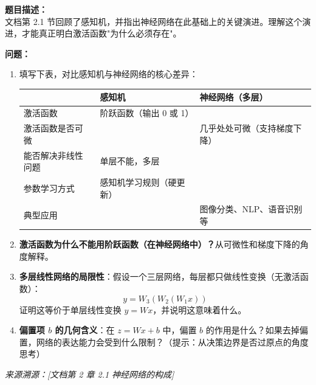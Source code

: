 \documentclass[a4paper,11pt]{ctexart}
\begin{document}
\begin{problembox}
    \textbf{题目描述：}\\
    文档第 2.1 节回顾了感知机，并指出神经网络在此基础上的关键演进。理解这个演进，才能真正明白激活函数"为什么必须存在"。

    \vspace{0.3cm}
    \textbf{问题：}
    \begin{enumerate}[(1)]
        \item 填写下表，对比感知机与神经网络的核心差异：

        \begin{center}
        \begin{tabular}{p{3.0cm} p{4.5cm} p{4.5cm}}
            \toprule
            & \textbf{感知机} & \textbf{神经网络（多层）} \\
            \midrule
            激活函数 & 阶跃函数（输出 0 或 1） & \underline{\hspace{4.0cm}} \\[1.2em]
            激活函数是否可微 & \underline{\hspace{4.0cm}} & 几乎处处可微（支持梯度下降） \\[1.2em]
            能否解决非线性问题 & 单层不能，多层\underline{\hspace{1.8cm}} & \underline{\hspace{4.0cm}} \\[1.2em]
            参数学习方式 & 感知机学习规则（硬更新） & \underline{\hspace{4.0cm}} \\[1.2em]
            典型应用 & \underline{\hspace{4.0cm}} & 图像分类、NLP、语音识别等 \\
            \bottomrule
        \end{tabular}
        \end{center}

        \item \textbf{激活函数为什么不能用阶跃函数（在神经网络中）？}从可微性和梯度下降的角度解释。

        \item \textbf{多层线性网络的局限性}：假设一个三层网络，每层都只做线性变换（无激活函数）：
        \[
        y = W_3 (W_2 (W_1 x))
        \]
        证明这等价于单层线性变换 $y = W x$，并说明这意味着什么。

        \item \textbf{偏置项 $b$ 的几何含义}：在 $z = Wx + b$ 中，偏置 $b$ 的作用是什么？如果去掉偏置，网络的表达能力会受到什么限制？（提示：从决策边界是否过原点的角度思考）
    \end{enumerate}

    \vspace{0.2cm}
    {\color{gray}\small\textit{来源溯源：[文档第 2 章 2.1 神经网络的构成]}}
\end{problembox}
\end{document}
